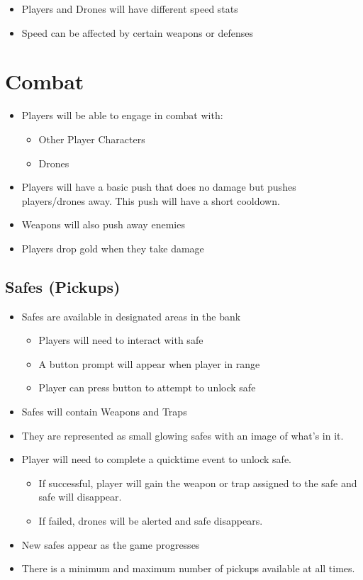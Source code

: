 \documentclass[10pt]{report}
\begin{document}
\begin{itemize}
    \item Players and Drones will have different speed stats
    \item Speed can be affected by certain weapons or defenses
\end{itemize}

\section{Combat}

\begin{itemize}
    \item Players will be able to engage in combat with:
    \begin{itemize}
        \item Other Player Characters
        \item Drones
    \end{itemize}
    \item Players will have a basic push that does no damage but pushes players/drones away. This push will have a short cooldown.
    \item Weapons will also push away enemies
    \item Players drop gold when they take damage
\end{itemize}

\subsection{Safes (Pickups)}

\begin{itemize}
    \item Safes are available in designated areas in the bank
    \begin{itemize}
        \item Players will need to interact with safe
        \item A button prompt will appear when player in range
        \item Player can press button to attempt to unlock safe
    \end{itemize}
    \item Safes will contain Weapons and Traps
    \item They are represented as small glowing safes with an image of what’s in it.
    \item Player will need to complete a quicktime event to unlock safe.
    \begin{itemize}
        \item If successful, player will gain the weapon or trap assigned to the safe and safe will disappear.
        \item If failed, drones will be alerted and safe disappears.
    \end{itemize}
    \item New safes appear as the game progresses
    \item There is a minimum and maximum number of pickups available at all times.    
\end{itemize}
\end{document}
